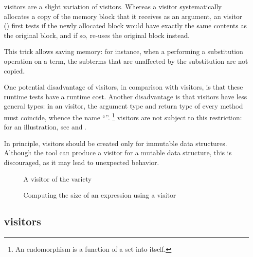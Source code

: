 \documentclass[11pt,a4paper,twoside]{article}
\begin{document}
\mapendo visitors are a slight variation of \map visitors. Whereas a \map
visitor systematically allocates a copy of the memory block that it receives
as an argument, an \mapendo visitor () first tests if the
newly allocated block would have exactly the same contents as the original
block, and if so, re-uses the original block instead.

This trick allows saving memory: for instance, when a performing a
substitution operation on a term, the subterms that are unaffected
by the substitution are not copied.

One potential disadvantage of \mapendo visitors, in comparison with \map
visitors, is that these runtime tests have a runtime cost. Another
disadvantage is that \mapendo visitors have less general types: in an \mapendo
visitor, the argument type and return type of every method must coincide,
whence the name ``\mapendo''.%
%
\footnote{An endomorphism is a function of a set into itself.}
%
\map visitors are not subject to this restriction: for an illustration, see
 and .

In principle, \mapendo visitors should be created only for immutable data
structures. Although the tool can produce a \mapendo visitor for a mutable
data structure, this is discouraged, as it may lead to unexpected behavior.


\begin{figure}[p]
\vspace{-\baselineskip}
\caption{A visitor of the \reduce variety}
\label{fig:expr15}
\end{figure}

\begin{figure}[p]
\caption{Computing the size of an expression using a \reduce visitor}
\label{fig:reduce}
\end{figure}

\subsection{\reduce visitors}
\label{sec:intro:reduce}
\end{document}
